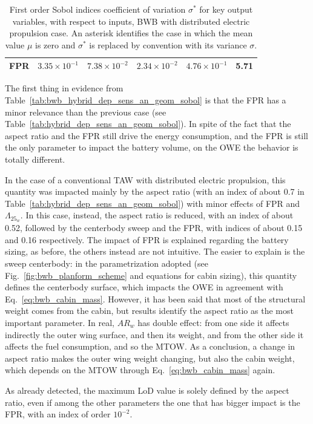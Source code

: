 \begin{table}[!h]
\begin{tabular}{l c c c c c}
		FPR & $3.35\times10^{-1}$ & $7.38\times10^{-2}$ & $2.34\times10^{-2}$ & $4.76\times10^{-1}$ & 5.71 \\
		\hline
	\end{tabular}
	\caption{First order Sobol indices coefficient of variation $\sigma^*$ for key output variables, with respect to inputs, BWB with distributed electric propulsion case.
		An asterisk identifies the case in which the mean value $\mu$ is zero and $\sigma^*$ is replaced by convention with its variance $\sigma$.}
	\label{tab:bwb_hybrid_dep_sens_an_geom_cv}
\end{table}

The first thing in evidence from Table~\ref{tab:bwb_hybrid_dep_sens_an_geom_sobol} is that the FPR has a minor relevance than the previous case (see Table~\ref{tab:hybrid_dep_sens_an_geom_sobol}). 
In spite of the fact that the aspect ratio and the FPR still drive the energy consumption, and the FPR is still the only parameter to impact the battery volume, on the OWE the behavior is totally different. 

In the case of a conventional TAW with distributed electric propulsion, this quantity was impacted mainly by the aspect ratio (with an index of about 0.7 in Table~\ref{tab:hybrid_dep_sens_an_geom_sobol}) with minor effects of FPR and $\Lambda_{25_{w}}$. 
In this case, instead, the aspect ratio is reduced, with an index of about 0.52, followed by the centerbody sweep and the FPR, with indices of about 0.15 and 0.16 respectively. 
The impact of FPR is explained regarding the battery sizing, as before, the others instead are not intuitive.
The easier to explain is the sweep centerbody: in the parametrization adopted (see Fig.~\ref{fig:bwb_planform_scheme} and equations for cabin sizing), this quantity defines the centerbody surface, which impacts the OWE in agreement with Eq.~\eqref{eq:bwb_cabin_mass}. 
However, it has been said that most of the structural weight comes from the cabin, but results identify the aspect ratio as the most important parameter. 
In real, $AR_w$ has double effect: from one side it affects indirectly the outer wing surface, and then its weight, and from the other side it affects the fuel consumption, and so the MTOW. 
As a conclusion, a change in aspect ratio makes the outer wing weight changing, but also the cabin weight, which depends on the MTOW through Eq.~\eqref{eq:bwb_cabin_mass} again. 

As already detected, the maximum LoD value is solely defined by the aspect ratio, even if among the other parameters the one that has bigger impact is the FPR, with an index of order $10^{-2}$. 

